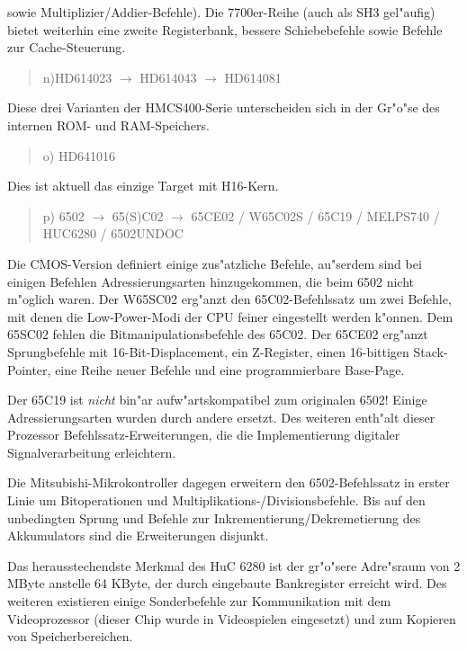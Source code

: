 \documentclass[12pt,a4paper,twoside]{report}
\begin{document}
sowie Multiplizier/Addier-Befehle).  Die 7700er-Reihe (auch als SH3
gel"aufig) bietet weiterhin eine zweite Registerbank, bessere
Schiebebefehle sowie Befehle zur Cache-Steuerung.
\begin{quote}
n)HD614023 $\longrightarrow$ HD614043 $\longrightarrow$ HD614081
\end{quote}
Diese drei Varianten der HMCS400-Serie unterscheiden sich in der
Gr"o"se des internen ROM- und RAM-Speichers.
\begin{quote}
o) HD641016
\end{quote}
Dies ist aktuell das einzige Target mit H16-Kern.
\begin{quote}
p) 6502 $\rightarrow$ 65(S)C02 $\rightarrow$ 65CE02 / W65C02S /
   65C19 / MELPS740 / HUC6280 / 6502UNDOC
\end{quote}
Die CMOS-Version definiert einige zus"atzliche Befehle, au"serdem sind
bei einigen Befehlen Adressierungsarten hinzugekommen, die beim 6502
nicht m"oglich waren.  Der W65SC02 erg"anzt den
65C02-Befehlssatz um zwei Befehle, mit denen die Low-Power-Modi
der CPU feiner eingestellt werden k"onnen.  Dem 65SC02 fehlen die
Bitmanipulationsbefehle des 65C02.  Der 65CE02 erg"anzt Sprungbefehle
mit 16-Bit-Displacement, ein Z-Register, einen 16-bittigen Stack-Pointer,
eine Reihe neuer Befehle und eine programmierbare Base-Page.

Der 65C19 ist {\em nicht} bin"ar aufw"artskompatibel zum
originalen 6502!  Einige Adressierungsarten wurden durch andere
ersetzt.  Des weiteren enth"alt dieser Prozessor
Befehlssatz-Erweiterungen, die die Implementierung digitaler
Signalverarbeitung erleichtern.

Die Mitsubishi-Mikrokontroller dagegen erweitern den
6502-Befehlssatz in erster Linie um Bitoperationen und
Multiplikations-/Divisionsbefehle.  Bis auf den unbedingten Sprung und
Befehle zur Inkrementierung/Dekremetierung des Akkumulators sind die
Erweiterungen disjunkt.

Das herausstechendste Merkmal des HuC 6280 ist der gr"o"sere
Adre"sraum von 2 MByte anstelle 64 KByte, der durch eingebaute
Bankregister erreicht wird.   Des weiteren existieren einige
Sonderbefehle zur Kommunikation mit dem Videoprozessor (dieser
Chip wurde in Videospielen eingesetzt) und zum Kopieren von
Speicherbereichen.
\end{document}
